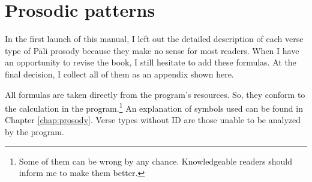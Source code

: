\chapter{Prosodic patterns}\label{chap:prospatt}

In the first launch of this manual, I left out the detailed description of each verse type of Pāli prosody because they make no sense for most readers. When I have an opportunity to revise the book, I still hesitate to add these formulas. At the final decision, I collect all of them as an appendix shown here.

All formulas are taken directly from the program's resources. So, they conform to the calculation in the program.\footnote{Some of them can be wrong by any chance. Knowledgeable readers should inform me to make them better.} An explanation of symbols used can be found in Chapter \ref{chap:prosody}. Verse types without ID are those unable to be analyzed by the program.

